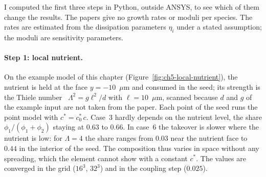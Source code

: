 I computed the first three steps in Python, outside ANSYS, to see which of them
change the results. The papers give no growth rates or moduli per species.
The rates are estimated from the dissipation parameters $\eta_i$ under a stated
assumption; the moduli are sensitivity parameters.

\paragraph{Step 1: local nutrient.} On the example model of this chapter
(Figure~\ref{fig:ch5-local-nutrient}), the nutrient is held at the face
$y=-10$~$\mu$m and consumed in the seed; its strength is the Thiele number~\cite{Thiele1939}
$\Lambda^2=g\ell^2/d$ with $\ell=10$~$\mu$m, scanned because $d$ and $g$ of the example
input are not taken from the paper. Each point of the seed runs the point
model with $c^*=c^*_0\,c$. Case~3 hardly depends on the nutrient level, the
share $\phi_1/(\phi_1+\phi_2)$ staying at $0.63$ to $0.66$. In case~6 the
takeover is slower where the nutrient is low: for $\Lambda=4$ the share ranges
from $0.03$ near the nutrient face to $0.44$ in the interior of the seed. The
composition thus varies in space without any spreading, which the element
cannot show with a constant $c^*$. The values are converged in the grid
($16^3$, $32^3$) and in the coupling step ($0.025$).

